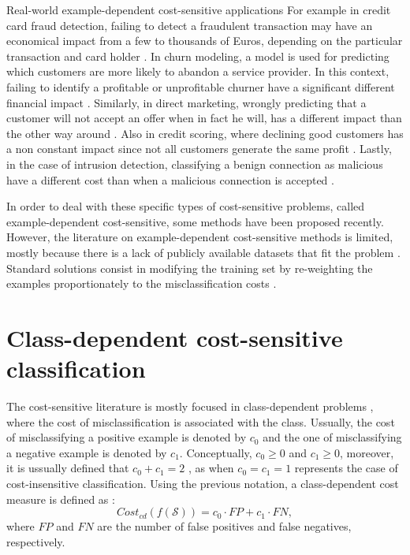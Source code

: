   \begin{remark}{Real-world example-dependent cost-sensitive applications}
  For example in credit card fraud detection, failing to detect a fraudulent transaction may have 
  an economical impact from a few to thousands of Euros, depending on the particular transaction 
  and card holder \citep{Sahin2013}. In churn modeling, a model is used for predicting which
  customers are more likely to abandon a service provider. In this context, failing to identify a 
  profitable or unprofitable churner have a significant different financial impact 
  \citep{Glady2009}. Similarly, in direct marketing, wrongly predicting that a customer will not 
  accept an offer when in fact he will, has a different impact than the other way around 
  \citep{Zadrozny2003}. Also in credit scoring, where declining good customers has a non constant 
  impact since not all  customers generate the same profit \citep{Verbraken2014}. Lastly, in the 
  case of intrusion   detection, classifying a benign connection as malicious have a different cost 
  than when a   malicious connection is accepted \citep{Ma2011}.
  \end{remark}

  In order to deal with these specific types of cost-sensitive problems, called example-dependent
  cost-sensitive, some methods have been proposed recently. However, the literature on 
  example-dependent cost-sensitive methods is limited, mostly because there is a lack of publicly 
  available datasets that fit the problem \citep{MacAodha2013}. Standard solutions consist in 
  modifying the training set by re-weighting the examples proportionately to the misclassification 
  costs \citep{Elkan2001,Zadrozny2003}.

  
\section{Class-dependent cost-sensitive classification}
\label{sec:3:class-dependent}

The cost-sensitive literature is mostly focused in class-dependent problems \citep{Elkan2001}, where 
the cost of misclassification is associated with the class. Ussually, the cost of misclassifying a 
positive example is denoted by $c_0$ and the one of misclassifying a negative example is denoted by 
$c_1$. Conceptually, $c_0\ge0$ and $c_1\ge0$, moreover, it is ussually defined that $c_0+c_1=2$ 
\citep{Flach2011a}, as when $c_0=c_1=1$ represents the case of cost-insensitive classification. 
Using the previous notation, a class-dependent cost measure is defined as \citep{Wang2014}:
\begin{equation}
  Cost_{cd}(f(\mathcal{S})) = c_0 \cdot FP + c_1 \cdot FN,
\end{equation}
where $FP$ and $FN$ are the number of false positives and false negatives, respectively.

